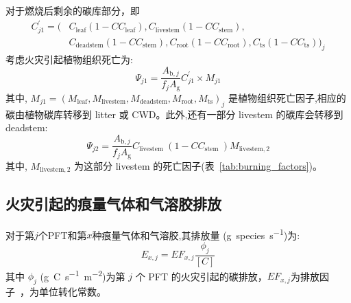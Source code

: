 对于燃烧后剩余的碳库部分，即
\begin{equation}
  \begin{aligned}
    C_{j 1}^{\prime}=\big(& C_{\text {leaf}}\left(1-C C_{\text {leaf}}\right), C_{\text {livestem}}\left(1-C C_{\text {stem}}\right), \\
    &C_{\text {deadstem}}\left(1-C C_{\text {stem}}\right), C_{\text {root}}\left(1-C C_{\text {root}}\right), C_{\mathrm{t s}}\left(1-C C_{\mathrm{t s}}\right)\big)_{j}
  \end{aligned}
\end{equation}
%
考虑火灾引起植物组织死亡为:
\begin{equation}
  \Psi_{j 1}=\frac{A_{\mathrm{b},j}}{f_{j} A_{\mathrm{g}}} C_{j 1}^{\prime} \times M_{j 1}
\end{equation}
%
其中, $
M_{j 1}=\left(M_{\text{leaf}}, M_{\text{livestem}}, M_{\text{deadstem}}, M_{\text {root}}, M_{\text {ts}}\right)_{j}
$ 是植物组织死亡因子,相应的碳由植物碳库转移到 litter 或 CWD。此外,还有一部分 livestem 的碳库会转移到 deadstem:
\begin{equation}
  \Psi_{j 2}=\frac{A_{\mathrm{b},j}}{f_{j} A_{\mathrm{g}}} C_{\text {livestem }}\left(1-C C_{\text {stem }}\right) M_{\text {livestem}, 2}
\end{equation}
%
其中, $M_{\text{livestem},2}$ 为这部分 livestem 的死亡因子(表~\ref{tab:burning_factors})。


\subsection{火灾引起的痕量气体和气溶胶排放}

对于第$j$个PFT和第$x$种痕量气体和气溶胶,其排放量 (\unit{g.species.s^{-1}})为:
\begin{equation}
  E_{x,j}=E F_{x,j} \frac{\phi_{j}}{[C]}
\end{equation}
其中 $\phi_{j}$ (\unit{g.C.s^{-1}.m^{-2}})为第 $j$ 个 PFT 的火灾引起的碳排放，$E F_{x,j}$为排放因子~\citep{LiF2019}，为单位转化常数。

